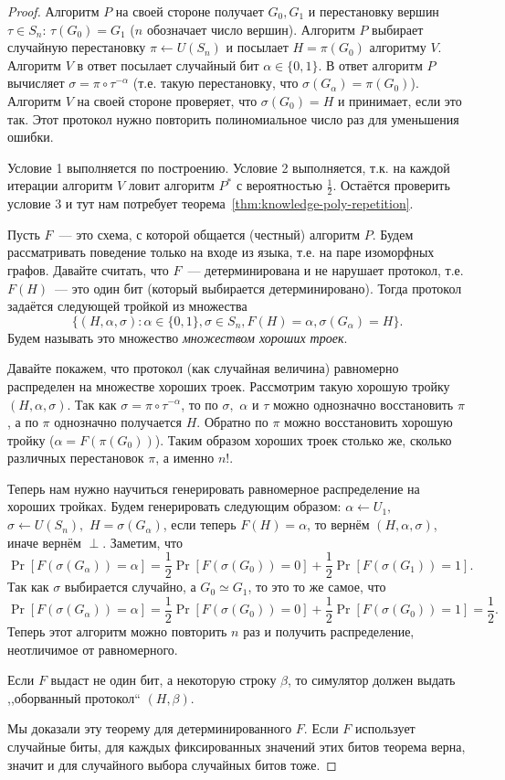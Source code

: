 \documentclass[12pt,a4paper]{article}
\newcommand{\bits}{\{0,1\}}
\theoremstyle{definition}
\theoremstyle{plain}
\theoremstyle{remark}
\begin{document}
\begin{proof}
Алгоритм $P$ на своей стороне получает $G_0, G_1$ и перестановку вершин $\tau\in S_n$: $\tau(G_0) = G_1$
($n$ обозначает число вершин). Алгоритм $P$ выбирает случайную перестановку $\pi\gets U(S_n)$ и посылает
$H = \pi(G_0)$ алгоритму $V$. Алгоритм $V$ в ответ посылает случайный бит $\alpha\in\{0,1\}$.
В ответ алгоритм $P$ вычисляет $\sigma = \pi\circ\tau^{-\alpha}$ (т.е. такую перестановку, что $\sigma(G_\alpha) = \pi(G_0)$). Алгоритм $V$ на своей стороне проверяет, что $\sigma(G_0) = H$ и принимает, если это так. Этот протокол нужно повторить полиномиальное число раз для уменьшения ошибки.

Условие 1 выполняется по построению. Условие 2 выполняется, т.к. на каждой итерации алгоритм $V$
ловит алгоритм $P^*$ с вероятностью $\frac{1}{2}$. Остаётся проверить условие 3 и тут нам потребует теорема~\ref{thm:knowledge-poly-repetition}.

Пусть $F$~--- это схема, с которой общается (честный) алгоритм $P$.
Будем рассматривать поведение только на входе из языка, т.е. на
паре изоморфных графов.
Давайте считать, что $F$~--- детерминирована и не нарушает протокол,
т.е. $F(H)$~--- это один бит (который выбирается детерминировано).
Тогда протокол задаётся следующей тройкой из множества  
$$\{(H,\alpha,\sigma): \alpha\in\bits, \sigma\in S_n, F(H)=\alpha, \sigma(G_\alpha)= H\}.$$ Будем называть это множество \emph{множеством хороших троек}.

Давайте покажем, что протокол (как случайная величина) равномерно распределен на множестве хороших троек. Рассмотрим такую хорошую тройку $(H,\alpha,\sigma)$. Так как $\sigma = \pi\circ\tau^{-\alpha}$,
то по $\sigma,$ $\alpha$ и $\tau$ можно однозначно 
восстановить $\pi$, а по $\pi$ однозначно получается $H$. Обратно по $\pi$ можно восстановить хорошую тройку ($\alpha= F(\pi(G_0))$). Таким образом хороших троек столько же, сколько различных перестановок $\pi$, а именно $n!$. 

Теперь нам нужно научиться генерировать
равномерное распределение на хороших тройках. Будем генерировать
следующим образом: $\alpha\gets U_1,$ $\sigma\gets U(S_n),$ $H=\sigma(G_\alpha)$, если теперь $F(H)=\alpha$, то вернём $(H,\alpha,\sigma)$, иначе вернём $\perp$. Заметим, что
$$\Pr[F(\sigma(G_\alpha)) = \alpha] = 
\frac12\Pr[F(\sigma(G_0)) = 0] +
\frac12\Pr[F(\sigma(G_1)) = 1].
$$
Так как $\sigma$ выбирается случайно, а $G_0\simeq G_1$, то это то же самое, что 
$$\Pr[F(\sigma(G_\alpha)) = \alpha] = 
\frac12\Pr[F(\sigma(G_0)) = 0] +
\frac12\Pr[F(\sigma(G_0)) = 1] = \frac12.
$$
Теперь этот алгоритм можно повторить $n$ раз и получить распределение, неотличимое от равномерного.

Если $F$ выдаст не один бит, а некоторую строку $\beta$, то симулятор должен выдать ,,оборванный протокол`` $(H,\beta)$.

Мы доказали эту теорему для детерминированного $F$. 
Если $F$ использует случайные биты, для каждых фиксированных
значений этих битов теорема верна, значит и для случайного выбора
случайных битов тоже.
\end{proof}
\end{document}
